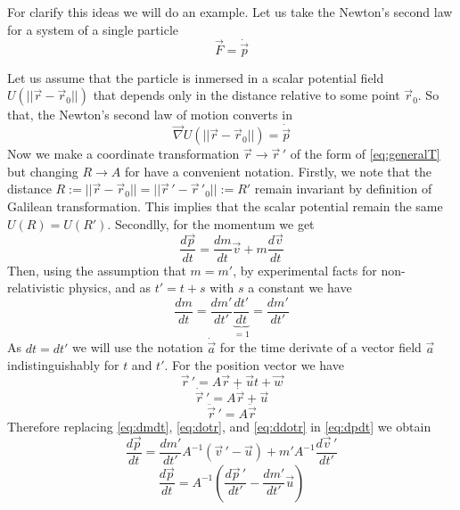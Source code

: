 \documentclass[11pt, letterpaper]{article}
\begin{document}
For clarify this ideas we will do an example. Let us take the Newton's second law for a system of a single particle
\begin{equation}
	\vec{F}=\dot{\vec{p}} \label{eq:F = dot p}
\end{equation}

Let us assume that the particle is inmersed in a scalar potential field $U(||\vec{r}-\vec{r}_0||)$ that depends only in the distance relative to some point $\vec{r}_0$. So that, the Newton's second law of motion converts in
\begin{equation}
	\vec{\nabla}U(||\vec{r}-\vec{r}_0||) = \dot{\vec{p}} \label{eq:2nd Law}
\end{equation}
Now we make a coordinate transformation $\vec{r}\to\vec{r}\,'$ of the form of \ref{eq:generalT} but changing $R\to A$ for have a convenient notation. Firstly, we note that the distance ${R:=||\vec{r}-\vec{r}_0||=||\vec{r}\,'-\vec{r}\,'_0||:=R'}$ remain invariant by definition of Galilean transformation. This implies that the scalar potential remain the same ${U(R)=U(R')}$. Secondlly, for the momentum we get
\begin{equation}
	\frac{d\vec{p}}{dt} = \frac{dm}{dt}\vec{v}+ m\frac{d\vec{v}}{dt} \label{eq:dpdt}
\end{equation}
Then, using the assumption that $m=m'$, by experimental facts for non-relativistic physics, and as $t'=t+s$ with $s$ a constant we have
\begin{equation}
\frac{dm}{dt}=\frac{dm'}{dt'} \underbrace{\frac{dt'}{dt}}_{=1}=\frac{dm'}{dt'} \label{eq:dmdt}
\end{equation}
As $dt=dt'$ we will use the notation $\dot{\vec{a}}$ for the time derivate of a vector field $\vec{a}$ indistinguishably for $t$ and $t'$. For the position vector we have
\begin{equation}
	 \vec{r}\,' = A\vec{r} + \vec{u}t+\vec{w} \label{eq:r}
\end{equation}
\begin{equation}
	\dot{\vec{r}}\,' = A\dot{\vec{r}} + \vec{u} \label{eq:dotr}
\end{equation}
\begin{equation}
	\ddot{\vec{r}}\,' = A\ddot{\vec{r}} \label{eq:ddotr}
\end{equation}
Therefore replacing \ref{eq:dmdt}, \ref{eq:dotr}, and \ref{eq:ddotr} in \ref{eq:dpdt} we obtain
$$	\frac{d\vec{p}}{dt} = \frac{dm'}{dt'}A^{-1}(\vec{v}\,'-\vec{u}) + m'A^{-1} \frac{d\vec{v}\,'}{dt'} $$ 
\begin{equation}
	\frac{d\vec{p}}{dt} = A^{-1}\left( \frac{d\vec{p}\,'}{dt'}-\frac{dm'}{dt'}\vec{u}\right) \label{eq: t dpdt}
\end{equation}
\end{document}
